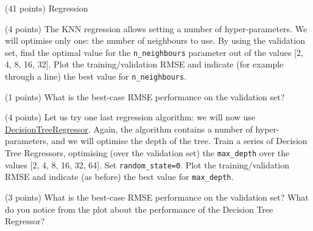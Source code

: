 \documentclass[12pt]{article}
\begin{document}
\begin{question}{\label{Q_LR_BA}(41 points) Regression}
\begin{subquestion}



\end{subquestion}

\begin{subquestion}{(4 points) The KNN regression allows setting a number of hyper-parameters. We will optimise only one: the number of neighbours to use. By using the validation set, find the optimal value for the \texttt{n\_neighbours} parameter out of the values [2, 4, 8, 16, 32]. Plot the training/validation RMSE and indicate (for example through a line) the best value for \texttt{n\_neighbours}.}






\end{subquestion}

\begin{subquestion}{(1 points) What is the best-case RMSE performance on the validation set?}






\end{subquestion}

\begin{subquestion}{(4 points) Let us try one last regression algorithm: we will now use \href{https://scikit-learn.org/stable/modules/generated/sklearn.tree.DecisionTreeRegressor.html}{DecisionTreeRegressor}. Again, the algorithm contains a number of hyper-parameters, and we will optimise the depth of the tree. Train a series of Decision Tree Regressors, optimising (over the validation set) the \texttt{max\_depth} over the values [2, 4, 8, 16, 32, 64]. Set \texttt{random\_state=0}. Plot the training/validation RMSE and indicate (as before) the best value for \texttt{max\_depth}.}






\end{subquestion}

\begin{subquestion}{(3 points) What is the best-case RMSE performance on the validation set? What do you notice from the plot about the performance of the Decision Tree Regressor?}




\end{subquestion}
\end{question}
\end{document}
